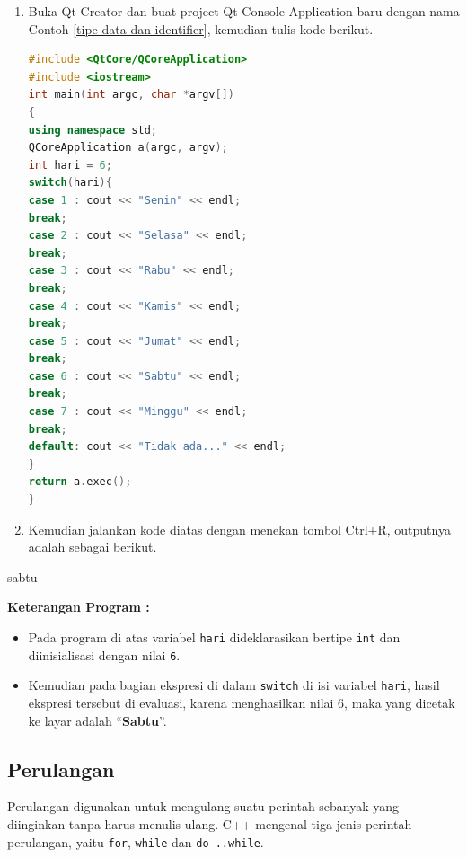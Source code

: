 \begin{enumerate}

\item
  Buka Qt Creator dan buat project Qt Console Application baru dengan
  nama Contoh \ref{tipe-data-dan-identifier}, kemudian tulis kode berikut.

\begin{lstlisting}[language=c++, caption=Tipe data dan Identifier, label=tipe-data-dan-identifier]
#include <QtCore/QCoreApplication>
#include <iostream>
int main(int argc, char *argv[])
{
using namespace std;
QCoreApplication a(argc, argv);
int hari = 6;
switch(hari){
case 1 : cout << "Senin" << endl;
break;
case 2 : cout << "Selasa" << endl;
break;
case 3 : cout << "Rabu" << endl;
break;
case 4 : cout << "Kamis" << endl;
break;
case 5 : cout << "Jumat" << endl;
break;
case 6 : cout << "Sabtu" << endl;
break;
case 7 : cout << "Minggu" << endl;
break;
default: cout << "Tidak ada..." << endl;
}
return a.exec();
}
\end{lstlisting}
\item
  Kemudian jalankan kode diatas dengan menekan tombol Ctrl+R, outputnya
  adalah sebagai berikut.
\end{enumerate}

\begin{lcverbatim}
sabtu
\end{lcverbatim}

\textbf{Keterangan Program :}

\begin{itemize}

\item
  Pada program di atas variabel \texttt{hari} dideklarasikan bertipe
  \texttt{int} dan diinisialisasi dengan nilai \texttt{6}.
\item
  Kemudian pada bagian ekspresi di dalam \texttt{switch} di isi variabel
  \texttt{hari}, hasil ekspresi tersebut di evaluasi, karena
  menghasilkan nilai 6, maka yang dicetak ke layar adalah
  ``\textbf{Sabtu}''.
\end{itemize}

\subsection{Perulangan}\label{b.-perulangan}

Perulangan digunakan untuk mengulang suatu perintah sebanyak yang
diinginkan tanpa harus menulis ulang. C++ mengenal tiga jenis perintah
perulangan, yaitu \texttt{for}, \texttt{while} dan \texttt{do\ ..while}.

